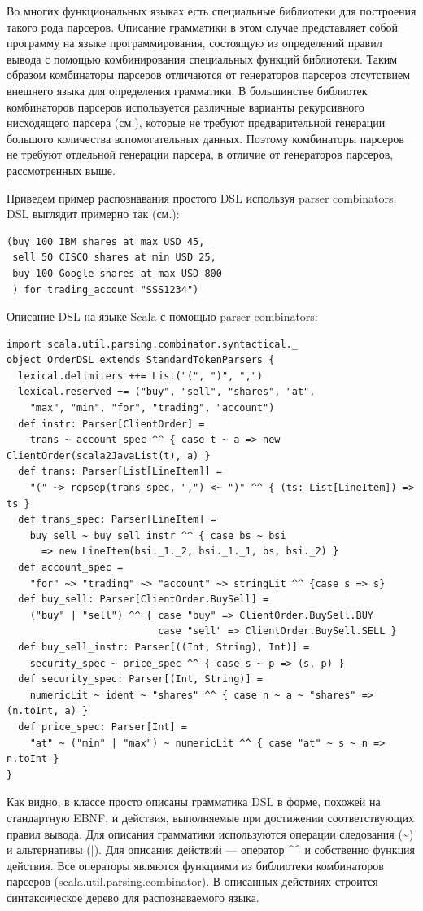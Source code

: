 \documentclass[a4paper,12pt,titlepage]{extarticle}
\begin{document}
Во многих функциональных языках есть специальные библиотеки для построения
такого рода парсеров. Описание грамматики в этом случае представляет собой
программу на языке программирования, состоящую из определений правил вывода с
помощью комбинирования специальных функций библиотеки. 
Таким образом комбинаторы парсеров отличаются от генераторов парсеров 
отсутствием внешнего языка для определения грамматики.
В большинстве библиотек комбинаторов парсеров используется различные варианты
рекурсивного нисходящего парсера (см.\cite{recdescp}), которые не требуют
предварительной генерации большого количества вспомогательных данных. Поэтому
комбинаторы парсеров не требуют отдельной генерации парсера, в отличие от
генераторов парсеров, рассмотренных выше.

Приведем пример распознавания простого DSL используя parser combinators.
DSL выглядит примерно так (см.\cite{scalapc}):
\begin{verbatim} 
(buy 100 IBM shares at max USD 45,
 sell 50 CISCO shares at min USD 25,
 buy 100 Google shares at max USD 800
 ) for trading_account "SSS1234")
\end{verbatim}
Описание DSL на языке Scala с помощью parser combinators:
\begin{verbatim} 
import scala.util.parsing.combinator.syntactical._
object OrderDSL extends StandardTokenParsers {
  lexical.delimiters ++= List("(", ")", ",")
  lexical.reserved += ("buy", "sell", "shares", "at", 
    "max", "min", "for", "trading", "account")
  def instr: Parser[ClientOrder] =
    trans ~ account_spec ^^ { case t ~ a => new ClientOrder(scala2JavaList(t), a) }
  def trans: Parser[List[LineItem]] =
    "(" ~> repsep(trans_spec, ",") <~ ")" ^^ { (ts: List[LineItem]) => ts }
  def trans_spec: Parser[LineItem] =
    buy_sell ~ buy_sell_instr ^^ { case bs ~ bsi 
      => new LineItem(bsi._1._2, bsi._1._1, bs, bsi._2) }
  def account_spec =
    "for" ~> "trading" ~> "account" ~> stringLit ^^ {case s => s}
  def buy_sell: Parser[ClientOrder.BuySell] =
    ("buy" | "sell") ^^ { case "buy" => ClientOrder.BuySell.BUY
                          case "sell" => ClientOrder.BuySell.SELL }
  def buy_sell_instr: Parser[((Int, String), Int)] =
    security_spec ~ price_spec ^^ { case s ~ p => (s, p) }
  def security_spec: Parser[(Int, String)] =
    numericLit ~ ident ~ "shares" ^^ { case n ~ a ~ "shares" => (n.toInt, a) }
  def price_spec: Parser[Int] =
    "at" ~ ("min" | "max") ~ numericLit ^^ { case "at" ~ s ~ n => n.toInt }
}
\end{verbatim}
Как видно, в классе просто описаны грамматика DSL в форме, похожей на
стандартную EBNF, и действия, выполняемые при достижении соответствующих
правил вывода.
Для описания грамматики используются операции следования (\~{}) и альтернативы
(|). Для описания действий --- оператор \^{}\^{} и собственно функция действия.
Все операторы являются функциями из библиотеки комбинаторов парсеров
(scala.util.parsing.combinator).
В описанных действиях строится синтаксическое дерево для распознаваемого языка.
\end{document}
